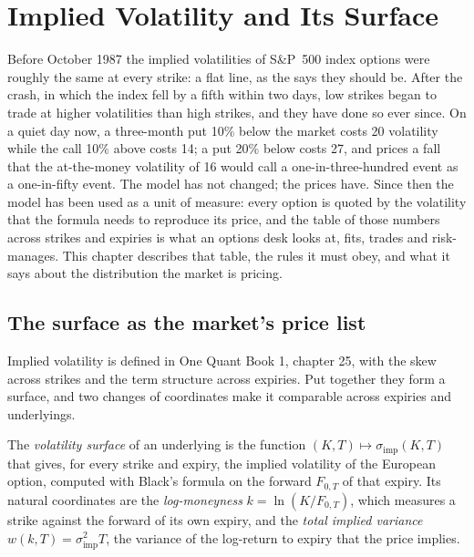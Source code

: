 \chapter{Implied Volatility and Its Surface}\label{ch:dv:implied-volatility-and-its-surface}

Before October 1987 the implied volatilities of S\&P~500 index options were
roughly the same at every strike: a flat line, as the 
says they should be. After the crash, in which the index fell by a fifth within
two days, low strikes began to trade at higher volatilities than high strikes,
and they have done so ever since. On a quiet day now, a three-month put 10\%
below the market costs 20 volatility while the call 10\% above costs 14; a put
20\% below costs 27, and prices a fall that the at-the-money volatility of 16
would call a one-in-three-hundred event as a one-in-fifty event. The model has
not changed; the prices have. Since then the model has been used as a unit of
measure: every option is quoted by the volatility that the formula needs to
reproduce its price, and the table of those numbers across strikes and expiries
is what an options desk looks at, fits, trades and risk-manages. This chapter
describes that table, the rules it must obey, and what it says about the
distribution the market is pricing.

\section{The surface as the market's price list}

Implied volatility is defined in One Quant Book 1, chapter 25, with the skew
across strikes and the term structure across expiries. Put together they form a
surface, and two changes of coordinates make it comparable across expiries and
underlyings.

\begin{definition}\label{def:dv:implied-volatility-and-its-surface:surface}
The \emph{volatility surface} of an underlying is the
function $(K,T)\mapsto\sigma_{\mathrm{imp}}(K,T)$ that gives, for every strike and
expiry, the implied volatility of the European option, computed with Black's formula
on the forward $F_{0,T}$ of that expiry. Its natural coordinates are the
\emph{log-moneyness} $k=\ln(K/F_{0,T})$, which measures a strike
against the forward of its own expiry, and the \emph{total implied
variance} $w(k,T)=\sigma_{\mathrm{imp}}^2T$, the variance
of the log-return to expiry that the price implies.
\end{definition}

